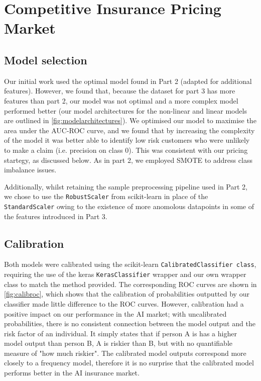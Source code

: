 \section{Competitive Insurance Pricing Market}
\subsection{Model selection}
Our initial work used the optimal model found in Part 2 (adapted for additional features). However, we found that, because the dataset for part 3 has more features than part 2, our model was not optimal and a more complex model performed better (our model architectures for the non-linear and linear models are outlined in \autoref{fig:modelarchitectures}). We optimised our model to maximise the area under the AUC-ROC curve, and we found that by increasing the complexity of the model it was better able to identify low risk customers who were unlikely to make a claim (i.e. precision on class 0). This was consistent with our pricing startegy, as discussed below. As in part 2, we employed SMOTE to address class imbalance issues.

Additionally, whilst retaining the sample preprocessing pipeline used in Part 2, we chose to use the \texttt{RobustScaler} from scikit-learn in place of the \texttt{StandardScaler} owing to the existence of more anomolous datapoints in some of the features introduced in Part 3.
\subsection{Calibration}
Both models were calibrated using the scikit-learn \texttt{CalibratedClassifier class}, requiring the use of the keras \texttt{KerasClassifier} wrapper and our own wrapper class to match the method provided. The corresponding ROC curves are shown in
\autoref{fig:calibroc}, which shows that the calibration of probabilities outputted by our classifier made little difference to the ROC curves. However, calibration had a positive impact on our performance in the AI market; with uncalibrated probabilities, there is no consistent connection between the model output and the risk factor of an individual. It simply states that if person A is has a higher model output than person B, A is riskier than B, but with no quantifiable measure of "how much riskier". The calibrated model outputs correspond more closely to a frequency model, therefore it is no surprise that the calibrated model performs better in the AI insurance market.

